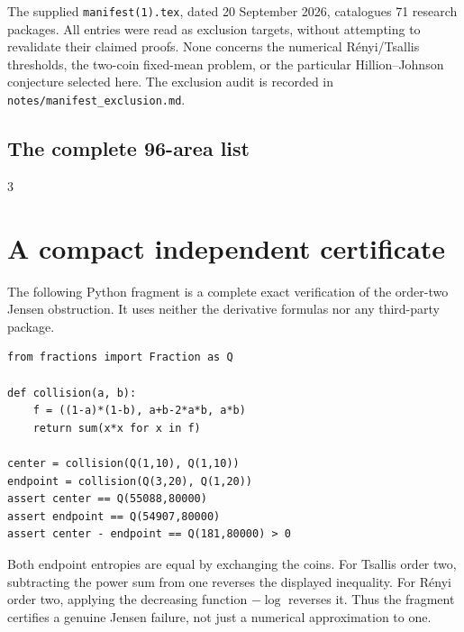 \documentclass[11pt]{article}
\numberwithin{equation}{section}
\theoremstyle{definition}
\theoremstyle{remark}
\begin{document}
The supplied \texttt{manifest(1).tex}, dated 20 September 2026, catalogues
71 research packages. All entries were read as exclusion targets, without
attempting to revalidate their claimed proofs. None concerns the numerical
R\'enyi/Tsallis thresholds, the two-coin fixed-mean problem, or the particular
Hillion--Johnson conjecture selected here. The exclusion audit is recorded
in \texttt{notes/manifest\_exclusion.md}.

\subsection*{The complete 96-area list}
\begin{multicols}{3}
\small
\begin{enumerate}[leftmargin=2.1em,label=\arabic*.,itemsep=.12em,parsep=0pt]

\end{enumerate}
\end{multicols}

\section{A compact independent certificate}\label{bep:app:certificate}
The following Python fragment is a complete exact verification of the
order-two Jensen obstruction. It uses neither the derivative formulas nor
any third-party package.
\begin{verbatim}
from fractions import Fraction as Q

def collision(a, b):
    f = ((1-a)*(1-b), a+b-2*a*b, a*b)
    return sum(x*x for x in f)

center = collision(Q(1,10), Q(1,10))
endpoint = collision(Q(3,20), Q(1,20))
assert center == Q(55088,80000)
assert endpoint == Q(54907,80000)
assert center - endpoint == Q(181,80000) > 0
\end{verbatim}
Both endpoint entropies are equal by exchanging the coins. For Tsallis
order two, subtracting the power sum from one reverses the displayed
inequality. For R\'enyi order two, applying the decreasing function
$-\log$ reverses it. Thus the fragment certifies a genuine Jensen failure,
not just a numerical approximation to one.
\end{document}
